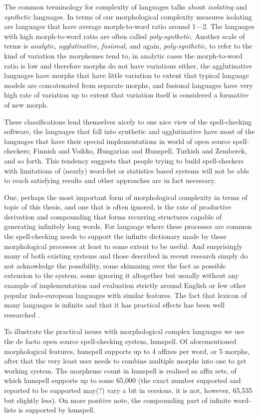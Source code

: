 \documentclass[officiallayout]{unihelcompling}
\begin{document}
The common terminology for complexity of languages talks about \emph{isolating}
and \emph{synthetic} languages. In terms of our morphological complexity
measures isolating are languages that have average morph-to-word ratio around
1---2. The languages with high morph-to-word ratio are often called
\emph{poly-synthetic}. Another scale of terms is \emph{analytic},
\emph{agglutinative}, \emph{fusional}, and again, \emph{poly-synthetic}, to
refer to the kind of variation the morphemes tend to, in analytic cases the
morph-to-word ratio is low and therefore morphs do not have variations either,
the agglutinative languages have morphs that have little variation to extent
that typical language models are concatenated from separate morphs, and
fusional languages have very high rate of variation up to extent that variation
itself is considered a formative of new morph. 

These classifications lend themselves nicely to one nice view of the
spell-checking software, the languages that fall into synthetic and
agglutinative have most of the languages that have their special
implementations in world of open source spell-checkers; Finnish and Voikko,
Hungarian and Hunspell, Turkish and Zemberek, and so forth.  This tendency
suggests that people trying to build spell-checkers with limitations of
(nearly) word-list or statistics based systems will not be able to reach
satisfying results and other approaches are in fact necessary.

One, perhaps the most important form of morphological complexity in terms of
topic of this thesis, and one that is often ignored, is the rate of productive
derivation and compounding that forms recurring structures capable of
generating infinitely long words. For language where these processes are common
the spell-checking needs to support the infinite dictionary made by these
morphological processes at least to some extent to be useful. And surprisingly
many of both existing systems and those described in recent research simply do
not acknowledge the possibility\citep{}, some skimming over the fact as possible
extension to the system, some ignoring it altogether but usually without any
example of implementation and evaluation strictly around English or few other
popular indo-european languages with similar features.  The fact that lexicon
of many languages is infinite and that it has practical effects has been well
researched \citep{kornai2002many}.

To illustrate the practical issues with morphological complex languages we use
the de facto open source spell-checking system, hunspell. Of aforementioned
morphological features, hunspell supports up to 4 affixes per word, or 5
morphs, after that the very least user needs to combine multiple morphs into
one to get working system. The morpheme count in hunspell is realised as affix
sets, of which hunspell supports up to some 65,000 (the exact number supported
and reported to be supported may(?) vary a bit in
versions, it is not, however, 65,535 but slightly less). On more positive
note, the compounding part of infinite word-lists is supported by hunspell.
\end{document}
